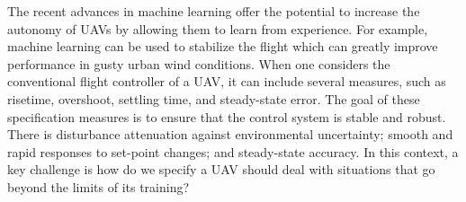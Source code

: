 \documentclass[sigconf]{acmart}
\begin{document}
The recent advances in machine learning offer the potential to increase the autonomy of UAVs by allowing them to learn from experience. For example, machine learning can be used to stabilize the flight which can greatly improve performance in gusty urban wind conditions. 
When one considers the conventional flight controller of a UAV, it can include several measures, such as risetime, overshoot, settling time, and steady-state error.
The goal of these specification measures is to ensure that the control system is stable and robust. 
There is disturbance attenuation against environmental uncertainty; smooth and rapid responses to set-point changes; and steady-state accuracy. 
In this context, a key challenge is how do we specify a UAV should deal with situations that go beyond the limits of its training?
%
%
%
%
%

%
%
%
%
%
%
\end{document}
